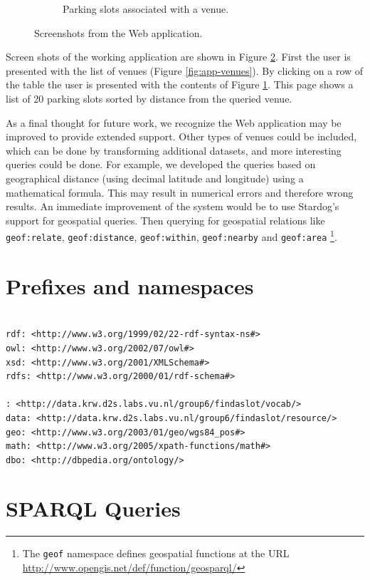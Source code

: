 \documentclass[runningheads,a4paper]{../../StyleFiles/llncs}
\begin{document}
\begin{figure}
\begin{subfigure}[b]{.4\textwidth}
		\caption{Parking slots associated with a venue.}
		\label{fig:app-slots}
	\end{subfigure}
	\caption{Screenshots from the Web application.}
	\label{fig:app}
\end{figure}

Screen shots of the working application are shown in Figure \ref{fig:app}. First the user is presented with the list of venues (Figure \ref{fig:app-venues}). By clicking on a row of the table the user is presented with the contents of Figure \ref{fig:app-slots}. This page shows a list of 20 parking slots sorted by distance from the queried venue.

As a final thought for future work, we recognize the Web application may be improved to provide extended support. Other types of venues could be included, which can be done by transforming additional datasets, and more interesting queries could be done. For example, we developed the queries based on geographical distance (using decimal latitude and longitude) using a mathematical formula. This may result in numerical errors and therefore wrong results. An immediate improvement of the system would be to
use Stardog's support for geospatial queries. Then querying for geospatial
relations like \texttt{geof:relate}, \texttt{geof:distance},
\texttt{geof:within}, \texttt{geof:nearby} and
\texttt{geof:area} \footnote{The \texttt{geof} namespace defines geospatial
functions at the URL \url{http://www.opengis.net/def/function/geosparql/}}.

\newpage
\appendix
\section{Prefixes and namespaces}
\begin{lstlisting}[captionpos=b, caption=Prefixes for the namespaces used in this project, label=lst:sparql,
basicstyle=\ttfamily\small,frame=bt]

rdf: <http://www.w3.org/1999/02/22-rdf-syntax-ns#>
owl: <http://www.w3.org/2002/07/owl#>
xsd: <http://www.w3.org/2001/XMLSchema#>
rdfs: <http://www.w3.org/2000/01/rdf-schema#>

: <http://data.krw.d2s.labs.vu.nl/group6/findaslot/vocab/>
data: <http://data.krw.d2s.labs.vu.nl/group6/findaslot/resource/>
geo: <http://www.w3.org/2003/01/geo/wgs84_pos#>
math: <http://www.w3.org/2005/xpath-functions/math#>
dbo: <http://dbpedia.org/ontology/>
\end{lstlisting}

\section{SPARQL Queries}
\end{document}
